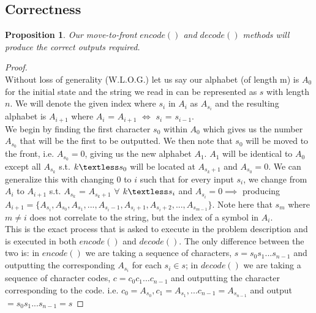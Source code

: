 \documentclass[12pt]{article}
\newtheorem{proposition}[theorem]{Proposition}
\begin{document}

\subsection{Correctness}

\begin{proposition}
Our move-to-front $encode()$ and $decode()$ methods will produce the correct outputs required.
\end{proposition}

\begin{proof}
~ \\ \indent Without loss of generality (W.L.O.G.) let us say our alphabet (of length m) is $A_0$ for the initial state
and the string we read in can be represented as $s$ with length $n$. We will denote the given
index where $s_i$ in $A_i$ as $A_{s_i}$ and the resulting alphabet is $A_{i+1}$ where $A_i$ =
$A_{i+1}$ $\iff$ $s_i$ = $s_{i-1}$. \\ \indent We begin by finding the first character $s_0$ within
$A_0$ which gives us the number $A_{s_0}$ that will be the first to be outputted. We then note
that $s_0$ will be moved to the front, i.e. $A_{s_0} = 0$, giving us the new alphabet $A_1$.
$A_1$ will be identical to $A_0$ except all $A_{s_k}$ s.t. $k \textless s_0$ will be located at
$A_{s_k+1}$ and $A_{s_0} = 0$. We can generalize this with changing 0 to $i$ such that for every
input $s_i$, we change from $A_{i}$ to $A_{i+1}$ s.t. $A_{s_k}$ = $A_{s_k+1}$ $\forall$ $k
\textless s_i$ and $A_{s_i} = 0 \implies$ producing $A_{i+1} = \{A_{s_i}, A_{s_0}, A_{s_1},...
, A_{s_i-1}, A_{s_i+1}, A_{s_i+2},..., A_{s_{m-1}}\}$. Note here that $s_m$ where $m \neq i$ does not
correlate to the string, but the index of a symbol in $A_i$. \\
\indent This is the exact process that is asked to execute in the problem description and is executed
in both $encode()$ and $decode()$. The only difference between the two is: in $encode()$ we are taking a
sequence of characters, $s = s_0 s_1 ... s_{n-1}$ and outputting the corresponding $A_{s_i}$ for
each $s_i \in s$; in $decode()$ we are taking a sequence of character codes, $c = c_0 c_1 ... c_{n-1}$ and
outputting the character corresponding to the code. i.e. $c_0 = A_{s_0}, c_1 = A_{s_1}, ...c_{n-1} =  A_{s_{n-1}}$
and output $= s_0 s_1 ... s_{n-1} = s$
\end{proof}
\end{document}
